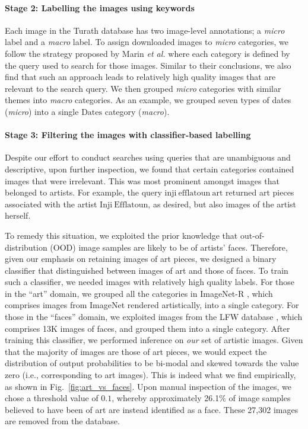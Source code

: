 \documentclass{article}
\begin{document}
\paragraph{Stage 2: Labelling the images using keywords}

Each image in the Turath database has two image-level annotations; a \textit{micro} label and a \textit{macro} label. To assign downloaded images to \textit{micro} categories, we follow the strategy proposed by Marin \textit{et al.} \cite{Marin2019} where each category is defined by the query used to search for those images. Similar to their conclusions, we also find that such an approach leads to relatively high quality images that are relevant to the search query. We then grouped \textit{micro} categories with similar themes into \textit{macro} categories. As an example, we grouped seven types of dates (\textit{micro}) into a single $\mathrm{Dates}$ category (\textit{macro}).

\paragraph{Stage 3: Filtering the images with classifier-based labelling}

Despite our effort to conduct searches using queries that are unambiguous and descriptive, upon further inspection, we found that certain categories contained images that were irrelevant. This was most prominent amongst images that belonged to artists. For example, the query $\mathrm{inji \ efflatoun \ art}$ returned art pieces associated with the artist $\mathrm{Inji \ Efflatoun}$, as desired, but also images of the artist herself. 

To remedy this situation, we exploited the prior knowledge that out-of-distribution (OOD) image samples are likely to be of artists' faces. Therefore, given our emphasis on retaining images of art pieces, we designed a binary classifier that distinguished between images of art and those of faces. To train such a classifier, we needed images with relatively high quality labels. For those in the \enquote{art} domain, we grouped all the categories in ImageNet-R \cite{Hendrycks2020OOD}, which comprises images from ImageNet rendered artistically, into a single category. For those in the \enquote{faces} domain, we exploited images from the LFW database \cite{LFW2007}, which comprises 13K images of faces, and grouped them into a single category. After training this classifier, we performed inference on \textit{our} set of artistic images. Given that the majority of images are those of art pieces, we would expect the distribution of output probabilities to be bi-modal and skewed towards the value zero (i.e., corresponding to art images). This is indeed what we find empirically, as shown in Fig.~\ref{fig:art_vs_faces}. Upon manual inspection of the images, we chose a threshold value of $0.1$, whereby approximately 26.1\% of image samples believed to have been of art are instead identified as a face. These 27,302 images are removed from the database. 
\end{document}

